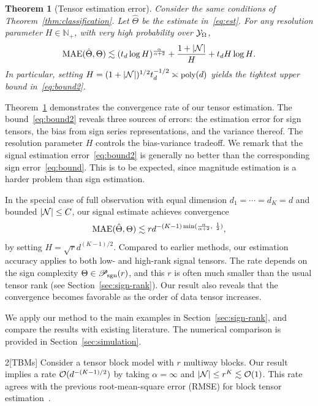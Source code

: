 \documentclass{article}
\theoremstyle{plain}
\newtheorem{thm}{Theorem}
\theoremstyle{definition}
\def\caliP{\mathscr{P}_{\textup{sgn}}}
\begin{document}
\begin{thm}[Tensor estimation error]\label{thm:estimation} Consider the same conditions of Theorem~\ref{thm:classification}. Let $\hat \Theta$ be the estimate in~\eqref{eq:est}. For any resolution parameter $H\in\mathbb{N}_{+}$, with very high probability over $\mathcal{Y}_\Omega$,
\begin{equation}\label{eq:bound2}
\textup{MAE}(\hat \Theta, \Theta)\lesssim (t_d\log H)^{\alpha\over \alpha+2}+{1+|\mathcal{N}|\over H}+{t_dH\log H}.
\end{equation}
In particular, setting $\footnotesize H= (1+|\tN|)^{1/2} t_d^{-1/2}\asymp \text{poly}(d)$ yields the tightest upper bound in~\eqref{eq:bound2}.
\end{thm}

Theorem~\ref{thm:estimation} demonstrates the convergence rate of our tensor estimation. The bound~\eqref{eq:bound2} reveals three sources of errors: the estimation error for sign tensors, the bias from sign series representations, and the variance thereof. The resolution parameter $H$ controls the bias-variance tradeoff. We remark that the signal estimation error~\eqref{eq:bound2} is generally no better than the corresponding sign error~\eqref{eq:bound}. This is to be expected, since magnitude estimation is  a harder problem than sign estimation. 

In the special case of full observation with equal dimension $d_1=\cdots=d_K=d$ and bounded $|\mathcal{N}|\leq C$, our signal estimate achieves convergence
\begin{equation}
\textup{MAE}(\hat \Theta, \Theta)\lesssim rd^{-(K-1)\min({\alpha\over \alpha+2},\ {1\over 2})},
\end{equation}
by setting $H= \sqrt{r}d^{(K-1)/2}$. Compared to earlier methods, our estimation accuracy applies to both low- and high-rank signal tensors. The rate depends on the sign complexity $\Theta\in\caliP(r)$, and this $r$ is often much smaller than the usual tensor rank (see Section~\ref{sec:sign-rank}). Our result also reveals that the convergence becomes favorable as the order of data tensor increases. 

We apply our method to the main examples in Section~\ref{sec:sign-rank}, and compare the results with existing literature. The numerical comparison is provided in Section~\ref{sec:simulation}. 

\vspace{.05cm}
\begin{customexample}{2}[TBMs]
Consider a tensor block model with $r$ multiway blocks. Our result implies a rate $\mathcal{O}(d^{-(K-1)/2})$ by taking $\alpha=\infty$ and $|\mathcal{N}| \leq r^K\lesssim \mathcal{O}(1)$. This rate agrees with the  previous root-mean-square error (RMSE) for block tensor estimation~\citep{wang2019multiway}.
\end{customexample}
\vspace{.05cm}
\end{document}
